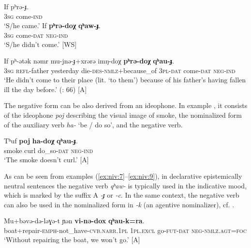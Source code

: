 \documentclass[output=paper,colorlinks,citecolor=brown]{langscibook}
\begin{document}
\ea\label{ex:niv:7}
    \ea\label{ex:niv:7a}
        \gll If pʰrə{}-ɟ. \\ 
             \textsc{3sg} come-\textsc{ind} \\
        \glt ‘S/he came.’
    \ex\label{ex:niv:7b}
        \gll If \textbf{pʰrə-doχ} \textbf{qʰaw-ɟ}. \\
             \textsc{3sg} come-\textsc{dat} \textsc{neg-ind}\\
        \glt  ‘S/he didn’t come.’ [WS]
    \z
\z

\ea\label{ex:niv:8}
    \gll If pʰ-ətək nəmr mu-jnə{}-ɟ+xrərə imŋ-doχ \textbf{pʰrə{}-doχ} \textbf{qʰau-ɟ}. \\ 
         \textsc{3sg} \textsc{refl-}father yesterday die-\textsc{des-nmlz}+because\_of \textsc{3pl}{}-\textsc{dat} come-\textsc{dat} \textsc{neg}{}-\textsc{ind}\\
    \glt ‘He didn’t come to their place (lit. ‘to them’) because of his father’s having fallen ill the day before.’ (\citealt{NedjalkovOtaina2013}: 66) [A]
\z 

The negative form can be also derived from an ideophone. In example , it consists of the ideophone \textit{poj} describing the visual image of smoke, the nominalized form of the auxiliary verb \textit{ha{}-} ‘be / do so’, and the negative verb.

\ea\label{ex:niv:9}
    \gll Tʰuf \textbf{poj} \textbf{ha-doχ} \textbf{qʰau-ɟ}. \\ 
         smoke curl do\_so-\textsc{dat} \textsc{neg}{}-\textsc{ind} \\
    \glt ‘The smoke doesn’t curl.’ \citep[222]{Panfilov1965} [A]
\z 

As can be seen from examples (\ref{ex:niv:7}--\ref{ex:niv:9}), in declarative epistemically neutral sentences the negative verb \textit{qʰaw{}-} is typically used in the indicative mood, which is marked by the suffix A \textit{-ɟ} or \textit{-c}. In the same context, the negative verb can also be used in the nominalized form in \textit{-k} (an agentive nominalizer), cf. .
    
\ea\label{ex:niv:10}
    \gll Mu+bəvə{}-də{}-ləɣə{}-t ɲən \textbf{vi-nə{}-dox} \textbf{qʰau-k=ra}. \\ 
         boat+repair-\textsc{emph-}not\_have-\textsc{cvb.narr.1pl} 1\textsc{pl}.\textsc{excl} go-\textsc{fut-dat} \textsc{neg-nmlz.agt=foc}\\
    \glt ‘Without repairing the boat, we won’t go.’ \citep[160]{Panfilov1965} [A]
\z 
\end{document}
